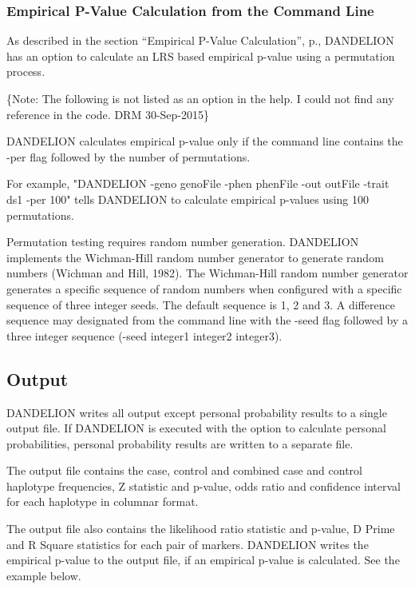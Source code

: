 \subsubsection{Empirical P-Value Calculation from the Command Line}
\label{subsec:p_val_cmd_line}
As described in the section ``Empirical P-Value Calculation'',
p.\pageref{subsec:emp_p_val}, DANDELION has an option to calculate an LRS based
empirical p-value using a permutation process.

\{Note: The following is not listed as an option in the help.  I could not find
any reference in the code. DRM 30-Sep-2015\}

DANDELION calculates empirical p-value only if the command line
contains the -per flag followed by the number of permutations.

For example, "DANDELION -geno genoFile -phen phenFile -out outFile -trait ds1
-per 100" tells DANDELION to calculate empirical p-values using 100
permutations.

Permutation testing requires random number generation.  DANDELION implements the
Wichman-Hill random number generator to generate random numbers (Wichman and
Hill, 1982).  The Wichman-Hill random number generator generates a specific
sequence of random numbers when configured with a specific sequence of three
integer seeds.  The default sequence is 1, 2 and 3.  A difference sequence may
designated from the command line with the -seed flag followed by a three integer
sequence (-seed integer1 integer2 integer3).

\subsection{Output}

DANDELION writes all output except personal probability results to a single
output file.  If DANDELION is executed with the option to calculate personal
probabilities, personal probability results are written to a separate file.

The output file contains the case, control and combined case and control haplotype frequencies, Z statistic and p-value, odds ratio and confidence interval for each haplotype in columnar format.

The output file also contains the likelihood ratio statistic and p-value, D
Prime and R Square statistics for each pair of markers.  DANDELION writes the
empirical p-value to the output file, if an empirical p-value is calculated.
See the example below.

